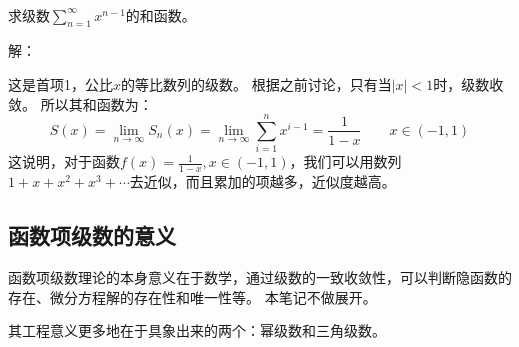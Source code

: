 ~

\begin{example}
求级数$\sum_{n=1}^{\infty}{x^{n-1}}$的和函数。
\end{example}

解：

这是首项1，公比$x$的等比数列的级数。
根据之前讨论，只有当$\left| x \right|<1$时，级数收敛。
所以其和函数为：
\[
S\left( x \right) =\underset{n\rightarrow \infty}{\lim}S_n\left( x \right) =\underset{n\rightarrow \infty}{\lim}\sum_{i=1}^n{x^{i-1}}=\frac{1}{1-x} \qquad x\in \left( -1,1 \right)
\]
这说明，对于函数$f\left( x \right) =\frac{1}{1-x},x\in \left( -1,1 \right) $，我们可以用数列$1+x+x^2+x^3+\cdots $去近似，而且累加的项越多，近似度越高。

\subsection{函数项级数的意义}

函数项级数理论的本身意义在于数学，通过级数的一致收敛性，可以判断隐函数的存在、微分方程解的存在性和唯一性等。
本笔记不做展开。

其工程意义更多地在于具象出来的两个：幂级数和三角级数。




